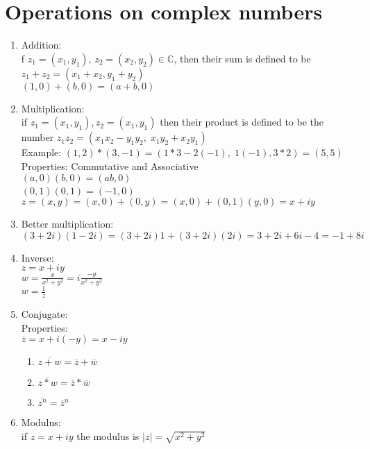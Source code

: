 \documentclass{article}
\begin{document}
\section{Operations on complex numbers}
\begin{enumerate}
	\item Addition:\\ f $z_1 = (x_1, y_1)$, $z_2 = (x_2, y_2) \in \mathbb{C}$, then their sum is defined to be $z_1 + z_2 = (x_1 + x_2, y_1 + y_2)$ \\
	$(1, 0)+(b, 0) = (a+b, 0)$
	\clearpage
	\item Multiplication:\\ if $z_1 = (x_1, y_1), z_2 = (x_1, y_1)$ then their product is defined to be the number $z_1z_2=(x_1x_2 - y_1y_2,\; x_1y_2 + x_2y_1)$ \\
	Example: $(1,2)*(3, -1) = (1*3 - 2(-1), \; 1(-1), 3*2) = (5, 5)$ \\
	Properties: Commutative and Associative \\
	$(a, 0)(b, 0) = (ab, 0)$ \\
	$(0, 1)(0, 1) = (-1, 0)$\ \\
	$z = (x,y) = (x, 0) + (0, y) = (x, 0) + (0, 1)(y, 0) = x+iy$
	\item Better multiplication: \\
	$(3 + 2i)(1 - 2i) = (3+2i)1 + (3+2i)(2i) = 3+2i+6i-4=-1 + 8i$
	\item Inverse: \\
	$z = x+ iy$ \\
	$w = \frac{x}{x^2 + y^2} = i\frac{-y}{x^2 + y^2}$ \\ 
	$w = \frac{1}{z}$ 	
	\item Conjugate: \\
	Properties: \\
	$\overline{z} = x+i(-y) = x-iy$
	\begin{enumerate}
		\item $\overline{z+w} = \overline{z} + \overline{w}$
		\item $\overline{z*w} = \overline{z} * \overline{w}$
		\item $\overline{z^n} = \overline{z}^n$
	\end{enumerate}
	\item Modulus: \\
	if $z=x+iy$ the modulus is $|z|=\sqrt{x^2 + y^2}$
	
\end{enumerate}
\end{document}
